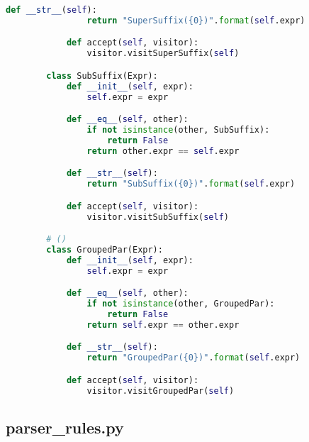 \begin{lstlisting}[language=Python]
            def __str__(self):
                return "SuperSuffix({0})".format(self.expr)

            def accept(self, visitor):
                visitor.visitSuperSuffix(self)

        class SubSuffix(Expr):
            def __init__(self, expr):
                self.expr = expr

            def __eq__(self, other):
                if not isinstance(other, SubSuffix):
                    return False
                return other.expr == self.expr

            def __str__(self):
                return "SubSuffix({0})".format(self.expr)

            def accept(self, visitor):
                visitor.visitSubSuffix(self)

        # ()
        class GroupedPar(Expr):
            def __init__(self, expr):
                self.expr = expr

            def __eq__(self, other):
                if not isinstance(other, GroupedPar):
                    return False
                return self.expr == other.expr

            def __str__(self):
                return "GroupedPar({0})".format(self.expr)

            def accept(self, visitor):
                visitor.visitGroupedPar(self)

    \end{lstlisting}

\subsection{parser\_rules.py}

